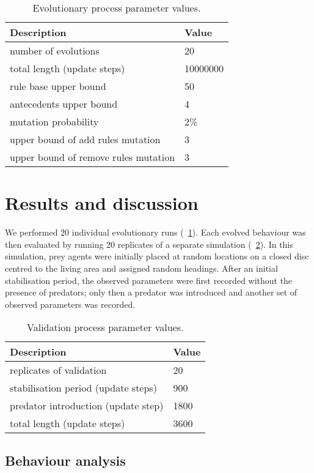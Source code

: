 \begin{table}
	\caption{Evolutionary process parameter values.}
	\label{tab:GA}
	\begin{tabular}{ll}
		\toprule
		Description & Value \\
		\midrule
		number of evolutions & 20 \\
		total length (update steps) & \num{10000000} \\
		rule base upper bound & 50 \\
		antecedents upper bound & 4 \\
		mutation probability & 2\% \\
		upper bound of add rules mutation & 3 \\
		upper bound of remove rules mutation & 3 \\
		\bottomrule
	\end{tabular}
\end{table}

\section{Results and discussion}

We performed 20 individual evolutionary runs (\tablename~\ref{tab:GA}). Each evolved behaviour was then evaluated by running 20 replicates of a separate simulation (\tablename~\ref{tab:EVA}). In this simulation, prey agents were initially placed at random locations on a closed disc centred to the living area and assigned random headings. After an initial stabilisation period, the observed parameters were first recorded without the presence of predators; only then a predator was introduced and another set of observed parameters was recorded. 

\begin{table}
	\caption{Validation process parameter values.}
	\label{tab:EVA}
	\begin{tabular}{ll}
		\toprule
		Description & Value \\
		\midrule
		replicates of validation & 20 \\
		stabilisation period (update steps) & 900 \\
		predator introduction (update step) & \num{1800} \\
		total length (update steps) & \num{3600} \\
		\bottomrule
	\end{tabular}
\end{table}

\subsection{Behaviour analysis}

